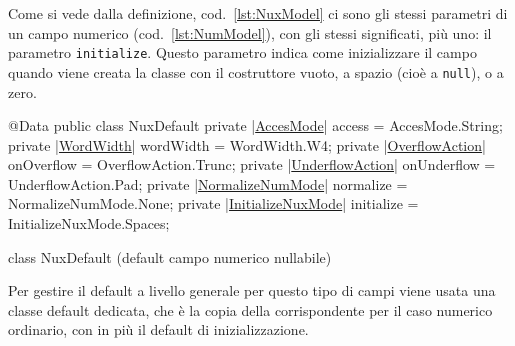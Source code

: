 \documentclass[a4paper,10pt]{report}
\newif\ifesource
\newenvironment{elisting}[1][!htb]
  {\captionsetup{aboveskip=0pt}\begin{listing}[#1]}
  {\end{listing}%
}
\begin{document}
Come si vede dalla definizione, cod.~\ref{lst:NuxModel} ci sono gli stessi
parametri di un campo numerico (cod.~\ref{lst:NumModel}), con gli stessi 
significati, più uno: il parametro \verb!initialize!.
Questo parametro indica come inizializzare il campo quando viene creata la
classe con il costruttore vuoto, a spazio (cioè a \verb!null!), o a zero.

\ifesource
\begin{figure*}[!htb]
\begin{lstlisting}[language=java, 
caption=class NuxDefault (default campo numerico nullabile), 
label=lst:NuxDefault]
@Data
public class NuxDefault {
    private (*\hyperref[lst:AccesMode]{AccesMode}*) access = AccesMode.String;
    private (*\hyperref[lst:WordWidth]{WordWidth}*) wordWidth = WordWidth.W4;
    private (*\hyperref[lst:OverflowAction]{OverflowAction}*) onOverflow = OverflowAction.Trunc;
    private (*\hyperref[lst:UnderflowAction]{UnderflowAction}*) onUnderflow = UnderflowAction.Pad;
    private (*\hyperref[lst:NormalizeNumMode]{NormalizeNumMode}*) normalize = NormalizeNumMode.None;
    private (*\hyperref[lst:InitializeNuxMode]{InitializeNuxMode}*) initialize = InitializeNuxMode.Spaces;
}
\end{lstlisting}\index{NuxDefault}
\end{figure*}
\else
\begin{elisting}
\begin{javacode}
@Data
public class NuxDefault {
    private |\hyperref[lst:AccesMode]{AccesMode}| access = AccesMode.String;
    private |\hyperref[lst:WordWidth]{WordWidth}| wordWidth = WordWidth.W4;
    private |\hyperref[lst:OverflowAction]{OverflowAction}| onOverflow = OverflowAction.Trunc;
    private |\hyperref[lst:UnderflowAction]{UnderflowAction}| onUnderflow = UnderflowAction.Pad;
    private |\hyperref[lst:NormalizeNumMode]{NormalizeNumMode}| normalize = NormalizeNumMode.None;
    private |\hyperref[lst:InitializeNuxMode]{InitializeNuxMode}| initialize = InitializeNuxMode.Spaces;
}
\end{javacode}
\caption{class NuxDefault (default campo numerico nullabile)}
\label{lst:NuxDefault}
\end{elisting}
\fi

Per gestire il default a livello generale per questo tipo di campi viene usata
una classe default dedicata, che è la copia della corrispondente per il caso
numerico ordinario, con in più il default di inizializzazione.
\end{document}
